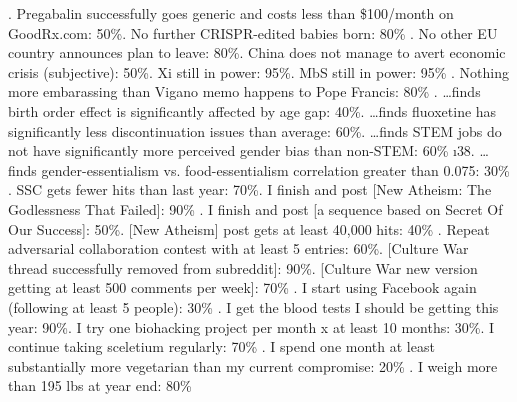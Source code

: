\begin{xmlentries}
\begin{xmlentriescontent}
{. Pregabalin successfully goes generic and costs less than \$100/month on GoodRx.com: 50\%. No further CRISPR-edited babies born: 80\%
\br
{}\br
{}. No other EU country announces plan to leave: 80\%. China does not manage to avert economic crisis (subjective): 50\%. Xi still in power: 95\%. MbS still in power: 95\%\br
{}. Nothing more embarassing than Vigano memo happens to Pope Francis: 80\%
. …finds birth order effect is significantly affected by age gap: 40\%. …finds fluoxetine has significantly less discontinuation issues than average: 60\%. …finds STEM jobs do not have significantly more perceived gender bias than non-STEM: 60\%\br
\i{38. …finds gender-essentialism vs. food-essentialism correlation greater than 0.075: 30\%}
. SSC gets fewer hits than last year: 70\%. I finish and post [New Atheism: The Godlessness That Failed]: 90\%\br
{}. I finish and post [a sequence based on Secret Of Our Success]: 50\%. [New Atheism] post gets at least 40,000 hits: 40\%\br
{}\br
{}. Repeat adversarial collaboration contest with at least 5 entries: 60\%. [Culture War thread successfully removed from subreddit]: 90\%. [Culture War new version getting at least 500 comments per week]: 70\%\br
{}. I start using Facebook again (following at least 5 people): 30\%
. I get the blood tests I should be getting this year: 90\%. I try one biohacking project per month x at least 10 months: 30\%. I continue taking sceletium regularly: 70\%\br
{}\br
{}\br
{}\br
{}. I spend one month at least substantially more vegetarian than my current compromise: 20\%\br
{}. I weigh more than 195 lbs at year end: 80\%\br
}
\end{xmlentriescontent}
\end{xmlentries}
